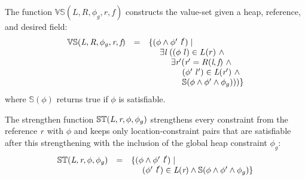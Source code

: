 
\begin{definition}
\label{def:VS}
The function $\mathbb{VS}(L,R,\phi_g,r,f)$ constructs the value-set given a
heap, reference, and desired field:
\[
\begin{array}{rcl}
  \mathbb{VS}(\cfgnt{L},\cfgnt{R},\phi_g,\cfgnt{r},\cfgnt{f}) & = & \{(\phi\wedge\phi^\prime\ \cfgnt{l}^\prime) \mid \\
  & & \ \ \ \ \exists \cfgnt{l}\ ((\phi\ l) \in L(r)\ \wedge \\
  & & \ \ \ \ \ \ \ \ \exists \cfgnt{r}^\prime ( \cfgnt{r}^\prime = R(\cfgnt{l},\cfgnt{f})\ \wedge \\
  & & \ \ \ \ \ \ \ \ \ \ \ \ (\phi^\prime\ l^\prime) \in \cfgnt{L}(\cfgnt{r}^\prime)\ \wedge\\
  & & \ \ \ \ \ \ \ \ \ \ \ \ \mathbb{S}(\phi\wedge\phi^\prime\wedge \phi_g)))\}
\end{array}
\]
where $\mathbb{S}(\phi)$ returns true if $\phi$ is satisfiable.
\end{definition}

\begin{definition}
\label{def:ST}
The strengthen function $\mathbb{ST}(\emph{L},\emph{r},\phi,\phi_g)$ strengthens every
constraint from the reference $\emph{r}$ with $\phi$ and keeps only location-constraint
pairs that are satisfiable after this strengthening with the inclusion of the global heap constraint $\phi_g$:
\[
\begin{array}{rcl} 
\mathbb{ST}(\emph{L},\emph{r},\phi,\phi_g) & = & \{ (\phi\wedge\phi^\prime\ \emph{l}^\prime) \mid  \\
& & \ \ \ \ (\phi^\prime\ \emph{l}^\prime)\in \emph{L}(\emph{r})\wedge\mathbb{S}(\phi\wedge\phi^\prime\wedge\phi_g) \}
\end{array}
\]
\end{definition}



